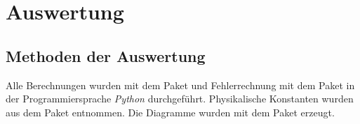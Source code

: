 \section{Auswertung}
\label{sec:Auswertung}





\subsection{Methoden der Auswertung} 
Alle Berechnungen wurden mit dem Paket \cite{numpy} und Fehlerrechnung mit dem Paket 
\cite{uncertainties}  in der Programmiersprache \textit{Python} durchgeführt. 
Physikalische Konstanten wurden aus dem Paket \cite{scipy} entnommen. Die Diagramme wurden 
mit dem Paket \cite{matplotlib} erzeugt.

